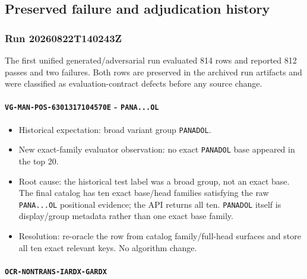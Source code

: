 \subsection{Preserved failure and adjudication history}\label{preserved-failure-and-adjudication-history}

\subsubsection{Run 20260822T140243Z}\label{run-20260822t140243z}

The first unified generated/adversarial run evaluated 814 rows and reported
812 passes and two failures. Both rows are preserved in the archived run
artifacts and were classified as evaluation-contract defects before any source
change.

\paragraph{\texorpdfstring{\texttt{VG-MAN-POS-6301317104570E} - \texttt{PANA...OL}}{VG-MAN-POS-6301317104570E - PANA...OL}}\label{vg-man-pos-6301317104570e---panaol}

\begin{itemize}
\tightlist
\item
  Historical expectation: broad variant group \texttt{PANADOL}.
\item
  New exact-family evaluator observation: no exact \texttt{PANADOL} base appeared in
  the top 20.
\item
  Root cause: the historical test label was a broad group, not an exact base.
  The final catalog has ten exact base/head families satisfying the raw
  \texttt{PANA...OL} positional evidence; the API returns all ten. \texttt{PANADOL} itself is
  display/group metadata rather than one exact base family.
\item
  Resolution: re-oracle the row from catalog family/full-head surfaces and
  store all ten exact relevant keys. No algorithm change.
\end{itemize}

\paragraph{\texorpdfstring{\texttt{OCR-NONTRANS-IARDX-GARDX}}{OCR-NONTRANS-IARDX-GARDX}}\label{ocr-nontrans-iardx-gardx}

